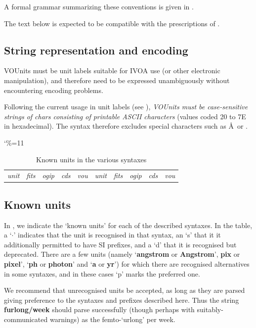 \documentclass[11pt,notitlepage,onecolumn]{ivoa}
\newcommand{\unit}[1]{\textbf{\textsf{\color{orange}#1}}}
\def\micro{{\symbo \char109}}
\begin{document}
A formal grammar summarizing these conventions is given
in .

The text below is expected to be compatible with the prescriptions of \citet{si-brochure}.

\subsection{String representation and encoding\label{sec:encoding}}


VOUnits must be unit labels suitable for IVOA use (or other electronic manipulation),
and therefore need to be expressed unambiguously without encountering
encoding problems.  

Following the current usage in unit labels
(see ), \emph{VOUnits must be
case-sensitive strings of chars consisting of printable ASCII
characters} (values coded 20 to 7E in hexadecimal).  The syntax
therefore excludes special characters such as \AA\ or \micro.

\begin{table}
\catcode`\%=11
\begin{tabular}{rccccrcccc}
\emph{unit}&\emph{fits}&\emph{ogip}&\emph{cds}&\emph{vou}&
\emph{unit}&\emph{fits}&\emph{ogip}&\emph{cds}&\emph{vou}\\

\end{tabular}
\caption{Known units in the various syntaxes\label{tabx:knownunits}}
\end{table}


\subsection{Known units}
\label{sec:knownunits}

In , we indicate the `known units' for each of the
described syntaxes.  In the table, a `$\cdot$' indicates that the unit
is recognised in that syntax, an `s' that it it additionally permitted
to have SI prefixes, and a `d' that it is recognised but deprecated.
There are a few units (namely `\unit{angstrom} or \unit{Angstrom}', 
\unit{pix} or \unit{pixel}', `\unit{ph} or \unit{photon}' and `\unit{a} or \unit{yr}') for
which there are recognised alternatives in some syntaxes, and in these
cases `p' marks the preferred one.

We recommend that unrecognised units be accepted, as long as they are
parsed giving preference to the syntaxes and prefixes described here.
Thus the string \unit{furlong/week} should parse successfully (though
perhaps with suitably-communicated warnings) as the femto-`urlong' per week.
\end{document}
